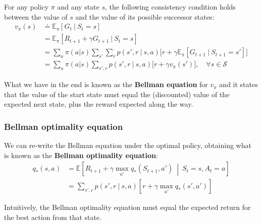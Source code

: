 For any policy $\pi$ and any state $s$, the following consistency condition holds between the value of $s$ and the value of its possible successor states:
\begin{equation}
    \begin{split}
        v_\pi(s) & \doteq \mathbb{E}_\pi \left[ G_t \ \vert \ S_t = s \right] \\
        & = \mathbb{E}_\pi \left[ R_{t+1} + \gamma G_{t+1} \ \vert \ S_t = s \right] \\
        & = \sum_{a} \pi(a \vert s) \sum_{s'} \sum_{r} p(s',r \ \vert \ s,a) \Big[ r + \gamma \mathbb{E}_\pi \left[ G_{t+1} \ \vert \ S_{t+1} = s' \right] \Big] \\
        & = \sum_{a} \pi (a \vert s) \sum_{s', r} p(s', r \ \vert \ s,a) \Big[ r + \gamma v_\pi(s') \Big], \quad \forall s \in \mathcal{S}
    \end{split}
    \label{eq:ch2-bellmanequation}
\end{equation}

What we have in the end is known as the \textbf{Bellman equation} for $v_\pi$ and it states that the value of the start state must equal the (discounted) value of the expected next state, plus the reward expected along the way.

\subsubsection{Bellman optimality equation}
We can re-write the Bellman equation under the optimal policy, obtaining what is known as the \textbf{Bellman optimality equation}:
\begin{equation}
    \begin{split}
        q_*(s,a) & = \mathbb{E} \left[ R_{t+1} + \gamma \max_{a'} q_* (S_{t+1}, a') \ \middle\vert \ S_t = s, A_t = a \right] \\
        & = \sum_{s', r} p(s',r \ \vert \ s,a) \left[ r + \gamma \max_{a'} q_*(s',a') \right]
    \end{split}
    \label{eq:ch2-bellmanoptimalityequation}
\end{equation}

Intuitively, the Bellman optimality equation must equal the expected return for the best action from that state. 

